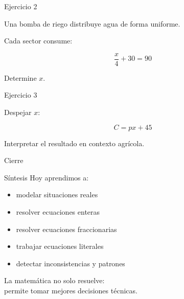 \documentclass[handout,aspectratio=169]{beamer}
\begin{document}
	\begin{frame}{Ejercicio 2}
		
		Una bomba de riego distribuye agua de forma uniforme.
		
		Cada sector consume:
		
		\[
		\frac{x}{4} + 30 = 90
		\]
		
		Determine \(x\).
		
	\end{frame}
	
	\begin{frame}{Ejercicio 3}
		
		Despejar \(x\):
		
		\[
		C = px + 45
		\]
		
		Interpretar el resultado en contexto agrícola.
		
	\end{frame}
	
	\begin{frame}{Cierre}
		
		\begin{block}{Síntesis}
			Hoy aprendimos a:
			
			\begin{itemize}
				\item modelar situaciones reales
				\item resolver ecuaciones enteras
				\item resolver ecuaciones fraccionarias
				\item trabajar ecuaciones literales
				\item detectar inconsistencias y patrones
			\end{itemize}
			
		\end{block}
		
		\begin{center}
			\Large
			La matemática no solo resuelve:\\
			permite tomar mejores decisiones técnicas.
		\end{center}
		
	\end{frame}
	
	
\end{document}
